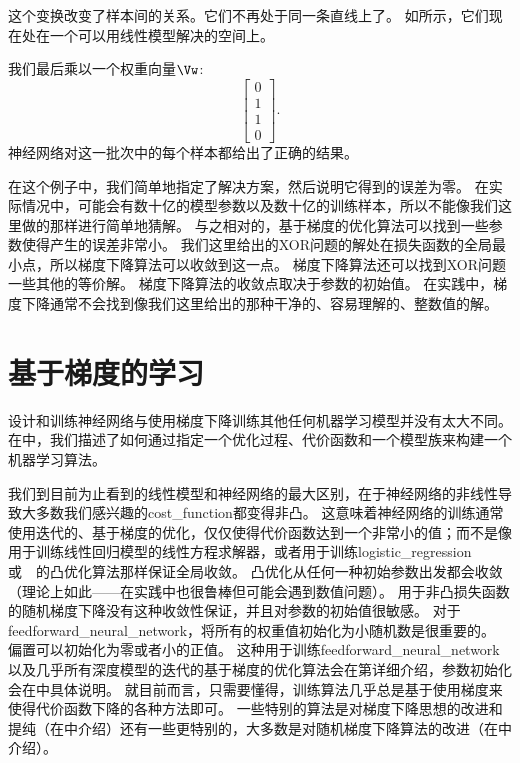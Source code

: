 
这个变换改变了样本间的关系。它们不再处于同一条直线上了。
如所示，它们现在处在一个可以用线性模型解决的空间上。

我们最后乘以一个权重向量$\Vw$:
\begin{equation}
\begin{bmatrix}
0\\
1\\
1\\
0
\end{bmatrix}.
\end{equation}
神经网络对这一批次中的每个样本都给出了正确的结果。

在这个例子中，我们简单地指定了解决方案，然后说明它得到的误差为零。
在实际情况中，可能会有数十亿的模型参数以及数十亿的训练样本，所以不能像我们这里做的那样进行简单地猜解。
与之相对的，基于梯度的优化算法可以找到一些参数使得产生的误差非常小。
我们这里给出的XOR问题的解处在损失函数的全局最小点，所以梯度下降算法可以收敛到这一点。
梯度下降算法还可以找到XOR问题一些其他的等价解。
梯度下降算法的收敛点取决于参数的初始值。
在实践中，梯度下降通常不会找到像我们这里给出的那种干净的、容易理解的、整数值的解。

\section{基于梯度的学习}
\label{sec:gradient_based_learning}

设计和训练神经网络与使用梯度下降训练其他任何机器学习模型并没有太大不同。
在中，我们描述了如何通过指定一个优化过程、代价函数和一个模型族来构建一个机器学习算法。

我们到目前为止看到的线性模型和神经网络的最大区别，在于神经网络的非线性导致大多数我们感兴趣的\gls{cost_function}都变得非凸。
这意味着神经网络的训练通常使用迭代的、基于梯度的优化，仅仅使得代价函数达到一个非常小的值；而不是像用于训练线性回归模型的线性方程求解器，或者用于训练\gls{logistic_regression}或~~的凸优化算法那样保证全局收敛。
凸优化从任何一种初始参数出发都会收敛（理论上如此——在实践中也很鲁棒但可能会遇到数值问题）。
用于非凸损失函数的随机梯度下降没有这种收敛性保证，并且对参数的初始值很敏感。
对于\gls{feedforward_neural_network}，将所有的权重值初始化为小随机数是很重要的。
偏置可以初始化为零或者小的正值。
这种用于训练\gls{feedforward_neural_network}以及几乎所有深度模型的迭代的基于梯度的优化算法会在第详细介绍，参数初始化会在中具体说明。
就目前而言，只需要懂得，训练算法几乎总是基于使用梯度来使得代价函数下降的各种方法即可。
一些特别的算法是对梯度下降思想的改进和提纯（在中介绍）还有一些更特别的，大多数是对随机梯度下降算法的改进（在中介绍）。

